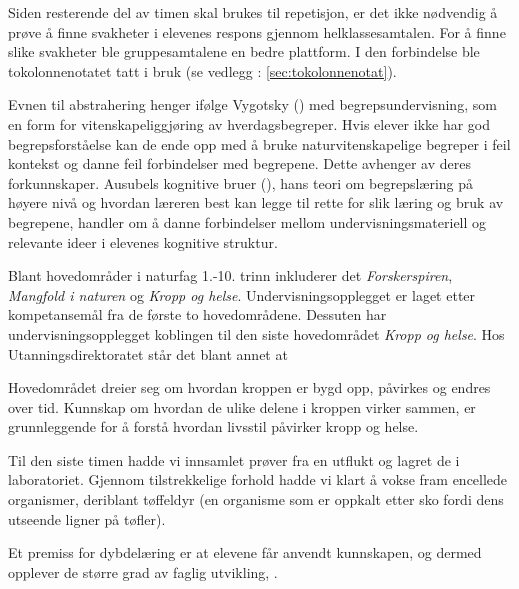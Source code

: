 \documentclass[main.tex]{subfiles}
\begin{document}



Siden resterende del av timen skal brukes til repetisjon, er det ikke nødvendig å 
prøve å finne svakheter i elevenes respons gjennom helklassesamtalen. For å finne slike svakheter 
ble gruppesamtalene en bedre plattform. I den forbindelse ble tokolonnenotatet tatt i bruk (se 
vedlegg : \ref{sec:tokolonnenotat}).

Evnen til abstrahering henger ifølge Vygotsky () med begrepsundervisning, som en
form for vitenskapeliggjøring av hverdagsbegreper. Hvis elever ikke har god begrepsforståelse
kan de ende opp med å bruke naturvitenskapelige begreper i feil kontekst og danne feil 
forbindelser med begrepene. Dette avhenger av deres forkunnskaper. Ausubels kognitive bruer 
(), hans teori om begrepslæring på høyere nivå og hvordan læreren best kan legge 
til rette for slik læring og bruk av begrepene,  handler om å danne forbindelser mellom undervisningsmateriell
og relevante ideer i elevenes kognitive struktur.

Blant hovedområder i naturfag 1.-10. trinn inkluderer det \emph{Forskerspiren}, \emph{Mangfold i naturen} og \emph{Kropp og helse}. Undervisningsopplegget er laget etter kompetansemål fra de første to hovedområdene. Dessuten har undervisningsopplegget koblingen til den siste hovedområdet \emph{Kropp og helse}. Hos Utanningsdirektoratet står det blant annet at
\begin{displayquote}
Hovedområdet dreier seg om hvordan kroppen er bygd opp, påvirkes og endres over tid. Kunnskap om hvordan de ulike delene i kroppen virker sammen, er grunnleggende for å forstå hvordan livsstil påvirker kropp og helse. 

\end{displayquote}

Til den siste timen hadde vi innsamlet prøver fra en utflukt og lagret de i laboratoriet. 
Gjennom tilstrekkelige forhold hadde vi klart å vokse fram encellede organismer, deriblant tøffeldyr 
(en organisme som er oppkalt etter sko fordi dens utseende ligner på tøfler).

Et premiss for dybdelæring er at elevene får anvendt kunnskapen, og dermed opplever de større grad av faglig utvikling, .
\end{document}
